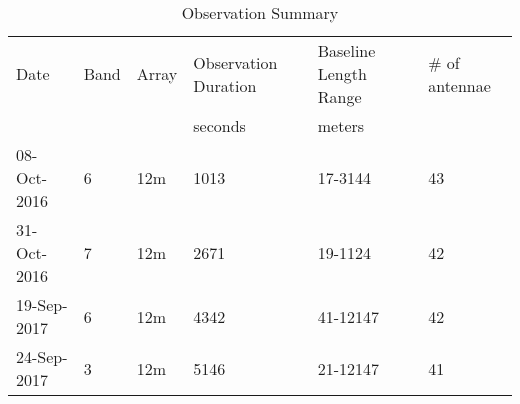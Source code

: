 
\begin{table*}[htp]
\centering
\caption{Observation Summary}
\begin{tabular}{llllll}
\label{tab:observations}
Date & Band & Array & Observation Duration &  Baseline Length Range  & \# of antennae\\
     &      &       & seconds              & meters                    & \\
\hline
08-Oct-2016 & 6 & 12m & 1013 & 17-3144 & 43\\
31-Oct-2016 & 7 & 12m & 2671 & 19-1124 & 42\\
19-Sep-2017 & 6 & 12m & 4342 & 41-12147 & 42\\
24-Sep-2017 & 3 & 12m & 5146 & 21-12147 & 41\\
\hline
\end{tabular}
\end{table*}

